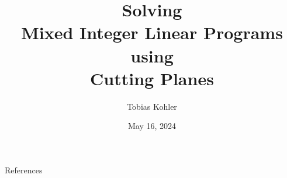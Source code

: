 


%

\title{Solving\\ Mixed Integer Linear Programs\\ using\\ Cutting Planes}
\author{Tobias Kohler}
\date{May 16, 2024}



\begin{frame}
    \maketitle
\end{frame}













\begin{frame}{References}
    \printbibliography
\end{frame}
 
